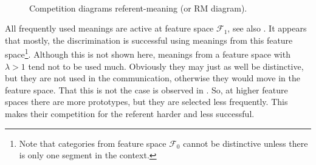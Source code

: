 \begin{figure}[t]
\centering
{}
\\
\caption{Competition diagrams referent-meaning (or RM diagram).}
\label{f:st:compRC}
\end{figure}


All frequently used meanings are active at feature space ${\mathcal F}_1$, see also . It appears that mostly, the discrimination is successful using meanings from this feature space\footnote{Note that categories from feature space ${\mathcal F}_0$ cannot be distinctive unless there is only one segment in the context.}. Although this is not shown here, meanings from a feature space with $\lambda>1$ tend not to be used much. Obviously they may just as well be distinctive, but they are not used in the communication, otherwise they would move in the feature space. That this is not the case is observed in . So, at higher feature spaces there are more prototypes, but they are selected less frequently. This makes their competition for the referent harder and less successful.

